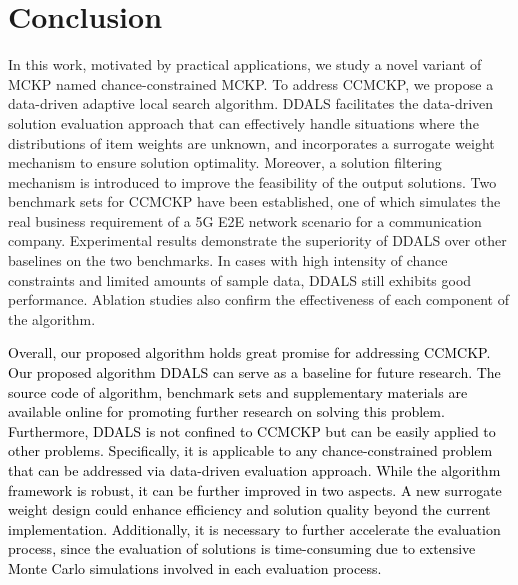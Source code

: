 \documentclass[lettersize,journal]{IEEEtran}
\begin{document}
\section{Conclusion}
\label{section:con}
In this work, motivated by practical applications, we study a novel variant of MCKP named chance-constrained MCKP. 
To address CCMCKP, we propose a data-driven adaptive local search algorithm.
DDALS facilitates the data-driven solution evaluation approach that can effectively handle situations where the distributions of item weights are unknown, and incorporates a surrogate weight mechanism to ensure solution optimality. 
Moreover, a solution filtering mechanism is introduced to improve the feasibility of the output solutions. 
Two benchmark sets for CCMCKP have been established, one of which simulates the real business requirement of a 5G E2E network scenario for a communication company. 
Experimental results demonstrate the superiority of DDALS over other baselines on the two benchmarks.
In cases with high intensity of chance constraints and limited amounts of sample data, DDALS still exhibits good performance.
Ablation studies also confirm the effectiveness of each component of the algorithm. 

\textcolor{black}{
Overall, our proposed algorithm holds great promise for addressing CCMCKP. 
Our proposed algorithm DDALS can serve as a baseline for future research. 
The source code of algorithm, benchmark sets and supplementary materials are available online for promoting further research on solving this problem. 
Furthermore, DDALS is not confined to CCMCKP but can be easily applied to other problems.
Specifically, it is applicable to any chance-constrained problem that can be addressed via data-driven evaluation approach.  
While the algorithm framework is robust, it can be further improved in two aspects. 
A new surrogate weight design could enhance efficiency and solution quality beyond the current implementation.
Additionally, it is necessary to further accelerate the evaluation process, since the evaluation of solutions is time-consuming due to extensive Monte Carlo simulations involved in each evaluation process.
}

\appendices



\end{document}
